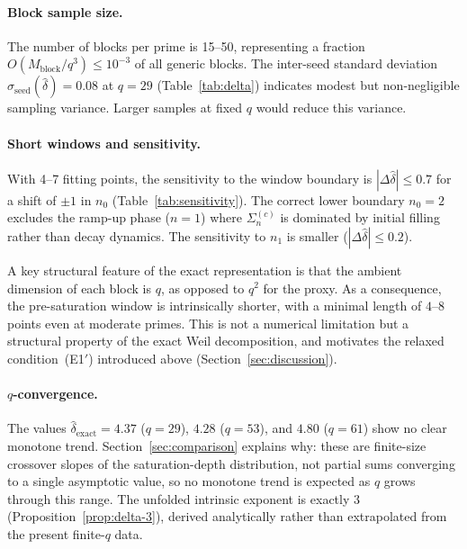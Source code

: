     \paragraph{Block sample size.}
      The number of blocks per prime is 15--50, representing a fraction
      $O(M_{\mathrm{block}}/q^3) \leq 10^{-3}$ of all generic blocks.
      The inter-seed standard deviation $\sigma_{\mathrm{seed}}(\hat{\delta}) = 0.08$
      at $q=29$ (Table~\ref{tab:delta}) indicates modest but non-negligible sampling variance.
      Larger samples at fixed $q$ would reduce this variance.

    \paragraph{Short windows and sensitivity.}
      With 4--7 fitting points, the sensitivity to the window boundary is
      $|\Delta\hat{\delta}| \leq 0.7$ for a shift of $\pm 1$ in $n_0$
      (Table~\ref{tab:sensitivity}).
      The correct lower boundary $n_0 = 2$ excludes the ramp-up phase ($n=1$)
      where $\Sigma_n^{(c)}$ is dominated by initial filling rather than decay dynamics.
      The sensitivity to $n_1$ is smaller ($|\Delta\hat{\delta}| \leq 0.2$).

      A key structural feature of the exact representation is that the ambient
      dimension of each block is $q$, as opposed to $q^2$ for the proxy.
      As a consequence, the pre-saturation window is intrinsically shorter,
      with a minimal length of $4$--$8$ points even at moderate primes.
      This is not a numerical limitation but a structural property of the exact Weil
      decomposition, and motivates the relaxed condition~(E1$'$) introduced above
      (Section~\ref{sec:discussion}).

    \paragraph{$q$-convergence.}
      The values $\hat{\delta}_{\mathrm{exact}} = 4.37$ ($q=29$), $4.28$ ($q=53$), and
      $4.80$ ($q=61$) show no clear monotone trend.
      Section~\ref{sec:comparison} explains why: these are finite-size crossover slopes
      of the saturation-depth distribution, not partial sums converging to a single
      asymptotic value, so no monotone trend is expected as $q$ grows through this range.
      The unfolded intrinsic exponent is exactly $3$ (Proposition~\ref{prop:delta-3}), derived
      analytically rather than extrapolated from the present finite-$q$ data.

